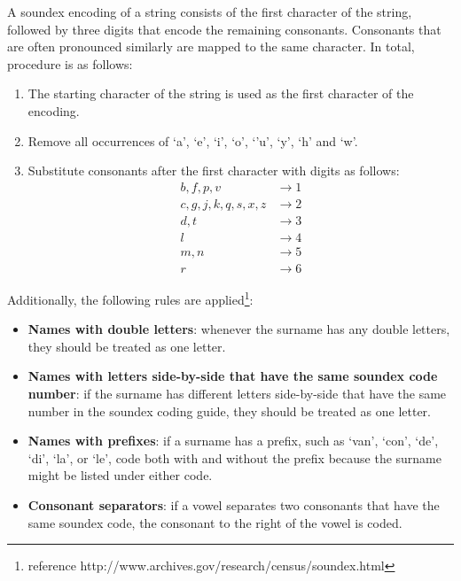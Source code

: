 A soundex encoding of a string consists of the first character of the string, followed by three digits that encode the remaining consonants.
Consonants that are often pronounced similarly are mapped to the same character.
In total, procedure is as follows:

\begin{enumerate}
    \item The starting character of the string is used as the first character of the encoding.
    \item Remove all occurrences of `a', `e', `i', `o', `'u', `y', `h' and `w'.
    \item Substitute consonants after the first character with digits as follows:\\
            \begin{align*}
                b, f, p, v &\rightarrow 1 \\
                c, g, j, k, q, s, x, z &\rightarrow 2 \\
                d, t &\rightarrow 3 \\
                l &\rightarrow 4 \\
                m, n &\rightarrow 5 \\
                r &\rightarrow 6
            \end{align*}
\end{enumerate}

Additionally, the following rules are applied\footnote{reference http://www.archives.gov/research/census/soundex.html}:

\begin{itemize}
    \item \textbf{Names with double letters}: whenever the surname has any double letters, they should be treated as one letter.
    \item \textbf{Names with letters side-by-side that have the same soundex code number}: if the surname has different letters side-by-side that have the same number in the soundex coding guide, they should be treated as one letter.
    \item \textbf{Names with prefixes}: if a surname has a prefix, such as `van', `con', `de', `di', `la', or `le', code both with and without the prefix because the surname might be listed under either code.
    \item \textbf{Consonant separators}: if a vowel separates two consonants that have the same soundex code, the consonant to the right of the vowel is coded.
\end{itemize}

